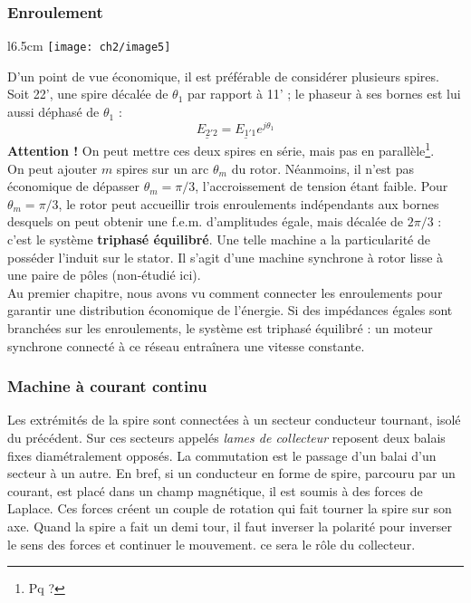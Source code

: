 		\subsubsection{Enroulement}
		\begin{wrapfigure}[9]{l}{6.5cm}
			\vspace{-5mm}
			\texttt{[image: ch2/image5]} 
			\end{wrapfigure}
		D'un point de vue économique, il est préférable de considérer 
		plusieurs spires. Soit 22', une spire décalée de $\theta_1$ 
		par rapport à 11' ; le phaseur à ses bornes est lui aussi 
		déphasé de $\theta_1$ :
		\begin{equation}
		\underline{E_{2'2}} = \underline{E_{1'1}}e^{j\theta_1}
		\end{equation}
		\textbf{Attention !} On peut mettre ces deux spires en série, 
		mais pas en parallèle\footnote{Pq ?}.\\
		
		On peut ajouter $m$ spires sur un arc $\theta_m$ du rotor. 
		Néanmoins, 	il n'est pas économique de dépasser $\theta_m = 
		\pi/3$, l'accroissement de tension étant faible. Pour $\theta_m = 
		\pi/3$, le rotor peut accueillir trois enroulements indépendants 
		aux bornes desquels on peut obtenir une f.e.m. d'amplitudes 
		égale, mais décalée de $2\pi/3$ : c'est le système \textbf{triphasé 
		équilibré}. Une telle machine a la particularité de posséder l'induit sur 
		le stator. Il s'agit d'une machine synchrone à rotor lisse à 
		une paire de pôles (non-étudié ici).\\
		
		Au premier chapitre, nous avons vu comment connecter les enroulements 
		pour garantir une distribution économique de l'énergie. Si des 
		impédances égales sont branchées sur les enroulements, le système 
		est triphasé équilibré : un moteur synchrone connecté à ce réseau 
		entraînera une vitesse constante.
		
		
		\subsubsection{Machine à courant continu}
		Les extrémités de la spire sont connectées à un secteur conducteur 
		tournant, isolé du précédent. Sur ces secteurs appelés \textit{lames 
		de collecteur} reposent deux balais fixes diamétralement opposés. La 
		commutation est le passage d'un balai d'un secteur à un autre. En bref, 
		si un conducteur en forme de spire, parcouru par un courant, est placé
		dans un champ magnétique, il est soumis à des forces de Laplace. Ces forces 
		créent un couple de rotation qui fait tourner la spire sur son axe. Quand 
		la spire a fait un demi tour, il faut inverser la polarité pour inverser le 
		sens des forces et continuer le mouvement. ce sera le rôle du collecteur.
		
